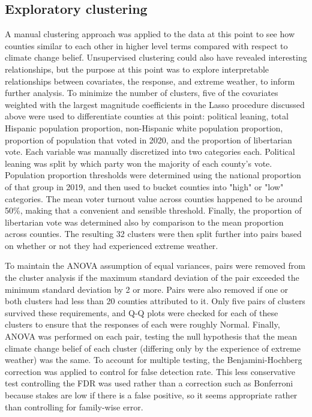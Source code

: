 \documentclass{article}
\begin{document}
\subsection{Exploratory clustering}
A manual clustering approach was applied to the data at this point to see how counties similar to each other in higher level terms compared with respect to climate change belief. Unsupervised clustering could also have revealed interesting relationships, but the purpose at this point was to explore interpretable relationships between covariates, the response, and extreme weather, to inform further analysis. To minimize the number of clusters, five of the covariates weighted with the largest magnitude coefficients in the Lasso procedure discussed above were used to differentiate counties at this point: political leaning, total Hispanic population proportion, non-Hispanic white population proportion, proportion of population that voted in 2020, and the proportion of libertarian vote. Each variable was manually discretized into two categories each. Political leaning was split by which party won the majority of each county's vote. Population proportion thresholds were determined using the national proportion of that group in 2019, and then used to bucket counties into "high" or "low" categories. The mean voter turnout value across counties happened to be around 50\%, making that a convenient and sensible threshold. Finally, the proportion of libertarian vote was determined also by comparison to the mean proportion across counties. The resulting 32 clusters were then split further into pairs based on whether or not they had experienced extreme weather.

To maintain the ANOVA assumption of equal variances, pairs were removed from the cluster analysis if the maximum standard deviation of the pair exceeded the minimum standard deviation by 2 or more. Pairs were also removed if one or both clusters had less than 20 counties attributed to it. Only five pairs of clusters survived these requirements, and Q-Q plots were checked for each of these clusters to ensure that the responses of each were roughly Normal. Finally, ANOVA was performed on each pair, testing the null hypothesis that the mean climate change belief of each cluster (differing only by the experience of extreme weather) was the same. To account for multiple testing, the Benjamini-Hochberg correction was applied to control for false detection rate. This less conservative test controlling the FDR was used rather than a correction such as Bonferroni because stakes are low if there is a false positive, so it seems appropriate rather than controlling for family-wise error.
\end{document}
